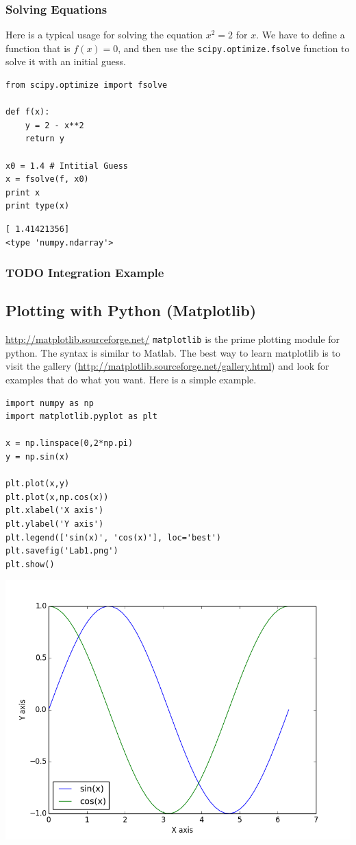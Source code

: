 \documentclass[11pt]{article}
\begin{document}
\subsubsection{Solving Equations}
\label{sec-3-10-1}
Here is a typical usage for solving the equation $x^2 = 2$ for $x$. We have to define a function that is $f(x) = 0$, and then use the \texttt{scipy.optimize.fsolve} function to solve it with an initial guess.

\begin{verbatim}
from scipy.optimize import fsolve

def f(x):
    y = 2 - x**2
    return y

x0 = 1.4 # Intitial Guess
x = fsolve(f, x0)
print x
print type(x)
\end{verbatim}

\begin{verbatim}
[ 1.41421356]
<type 'numpy.ndarray'>
\end{verbatim}



\subsubsection{{\bfseries\sffamily TODO} Integration Example}
\label{sec-3-10-2}



\subsection{Plotting with Python (Matplotlib)}
\label{sec-3-11}
\url{http://matplotlib.sourceforge.net/}
\texttt{matplotlib} is the prime plotting module for python. The syntax is similar to Matlab. The best way to learn matplotlib is to visit the gallery (\url{http://matplotlib.sourceforge.net/gallery.html}) and look for examples that do what you want. Here is a simple example.

\begin{verbatim}
import numpy as np
import matplotlib.pyplot as plt

x = np.linspace(0,2*np.pi)
y = np.sin(x)

plt.plot(x,y)
plt.plot(x,np.cos(x))
plt.xlabel('X axis')
plt.ylabel('Y axis')
plt.legend(['sin(x)', 'cos(x)'], loc='best')
plt.savefig('Lab1.png')
plt.show()
\end{verbatim}

\includegraphics[width=.9\linewidth]{./Lab1.png}
\end{document}
